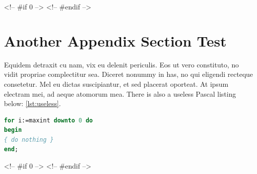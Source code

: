 <!-- #if 0 -->
<!-- #endif -->




\section{Another Appendix Section Test}
Equidem detraxit cu nam, vix eu delenit periculis. Eos ut vero
constituto, no vidit propriae complectitur sea. Diceret nonummy in
has, no qui eligendi recteque consetetur. Mel eu dictas suscipiantur,
et sed placerat oporteat. At ipsum electram mei, ad aeque atomorum
mea. There is also a useless Pascal listing below: \autoref{lst:useless}.

\begin{lstlisting}[float=b,language=Pascal,frame=tb,caption={A floating example (\texttt{listings} manual)},label=lst:useless]
for i:=maxint downto 0 do
begin
{ do nothing }
end;
\end{lstlisting}

<!-- #if 0 -->
<!-- #endif -->
